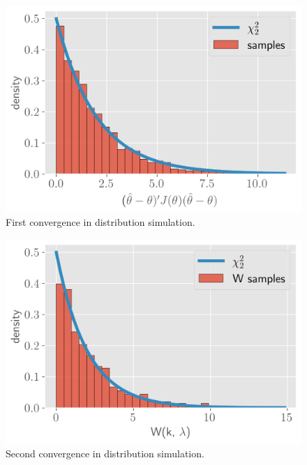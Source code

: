 \documentclass[11pt]{article}
\begin{document}
\begin{figure}[!h]
    \centering
    \includegraphics[scale=.7]{homework_2/figures/convergence_1.png}
    \caption{First convergence in distribution simulation.}
    \label{fig:my_label}
\end{figure}

\begin{figure}[!h]
    \centering
    \includegraphics[scale=.7]{homework_2/figures/convergence_2.png}
    \caption{Second convergence in distribution simulation.}
    \label{fig:my_label}
\end{figure}
\end{document}
